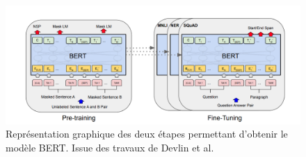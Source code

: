 \begin{figure}[h]
  \centering
  \includegraphics[width=16.5cm]{./Chapitre2/figures/bert.png}
  \caption{Représentation graphique des deux étapes permettant d'obtenir le modèle BERT. Issue des travaux de Devlin et al.~\cite{Devlin2019}}
  \label{fig:BERT}
\end{figure}
